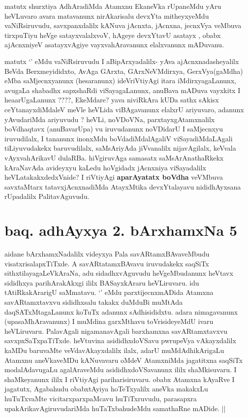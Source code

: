 \begin{artha}
matutx shurxtiya AdhAradiMda Atamxnu EkaneVka rUpaneMdu yAru heVLuvaro avara 
matavanunx nirAkarisalu devxYta mitheyxyeMdu vaNiRsiruvudu, savxpanxdalilx 
kANuva jAcnxta, jAcnxna, jecnxVya veMbuva tirxpuTiyu heVge satayxvalalxvoV, 
hAgeye devxYtavU asatayx , obabx ajAcnxniyeV asatayxvAgiye  vayxvahAravanunx 
elalxvanunx mADuvanu. 

matutx `\stext' eMdu vaNiRsiruvudu I aBipArxyadalilx- yAva ajAcnxnadasheyalilx 
BeVda Berxmeyididxto, AvAga GArxta, GArxNeVMdirxya, GerxVya(gaMdha) eMba 
saMjecnxyanunx (hesaranunx) ideVriVtiyAgi itara iMdirxyagaLanunx, avugaLa 
shabadhx sapxshaRdi viSayagaLanunx, anuBava mADuva vayxkitx I heaarUgaLanunx ????,
EkeMdare? yava niviRkAra kUDa sathx sAkisx ceYtanayxdiMdaleV meVle heVLida viBAgavanunx 
elalxrU ariyuvaro, adanunx yAvudariMda ariyuvudu ? heVLi, noVDoVNa, parxtayxgAtamxnalilx 
boVdhaqtavx (anuBavarUpa) vu iruvudanunx  noVDidarU I saMjecnxyu iruvudilalx, I tananunx 
inonxMdu boVdadiMdalAgaliV viSayadiMdaLAgali tiLiyuvudakekx baruvudilalx, saMsAriyAda 
jiVvanalilx nijavAgilalx, keVvala vAyxvahArikavU dulaRBa. hiVgiruvAga samasatx 
saMsArAnathaRkekx kAraNavAda avideyxyu kaLedu hoVgidadx jAcnxniya viSayadalilx 
heVLatakakxdedxVnide? I riVtiyAgi \textbf{aparAyatatx boVdha} veVMbuva savxtaMtarx 
tatavxjAcnxnadiMda AtayxMtika devxYtalayavu nididhAyxsana rUpadalilx PalitavAguvudu.
\end{artha}

\section*{baq. adhAyxya 2. bArxhamxNa 5}

\begin{center}
\end{center}

\begin{artha}
aidane bArxhamxNadalilx videyxya Pala savARtamxBAvaveMbudu visatxrisalapxTiTxde. A savARtatamxBAvavu iruvudakekx saqSiTx sithxtilayagaLeVkAraNa, adu sidadhxvAguvudu heVgeMbudanunx heVtavx sididhxya parihArakAkxgi ililx BASayxkAraru heVLiruvaru. idu tAtiRkakArarigU saMmatavu. `\stext' eMdu parxtijecnxmADida Atamxna savARtamxtavxvu sididhxsalu takakx duMduBi muMtAda daqSATxMtagaLanunx koTuTx adanunx sAdhisididxtu. adara nimagavanunx (upasaMhAravanunx) I muMdina garxMthavu toVrisideyeMdU ivaru heVLiruvaru. PalavAgali nigamanavAgali barxhamxna savARtamxtavxvu savxpxSaTxpaTiTxde. heVtuvina asididhxdoVSavu pwrupeVya vAkayxdalilx kaMDu baruvaMte veVdavAkayxdalilx ilalx, adarU muMdAdhikArigaLu Atamxnu aneVkaveMDu kANuvavaru oMdeV AtamxniMda jagatitxna saqSiTx modalAdavugaLu agalAraveMdu asididhxdoVSavanunx ililx shaMkisuvaru. I shaMkeyanunx ililx I riVtiyAgi pariharisiruvaru. obabx Atamxna kAyaRve I jagatutx, Agabahudu obabxtAyiya hoTeTxyalilx aneVka makakxLu huTuTxvaMte vicitarxparxpaMcavu huTiTxruvudu, parasapxra upakArikavAgiruvudariMda huTaTxbahudeMdu samathaRne mADide. ||
\end{artha}

